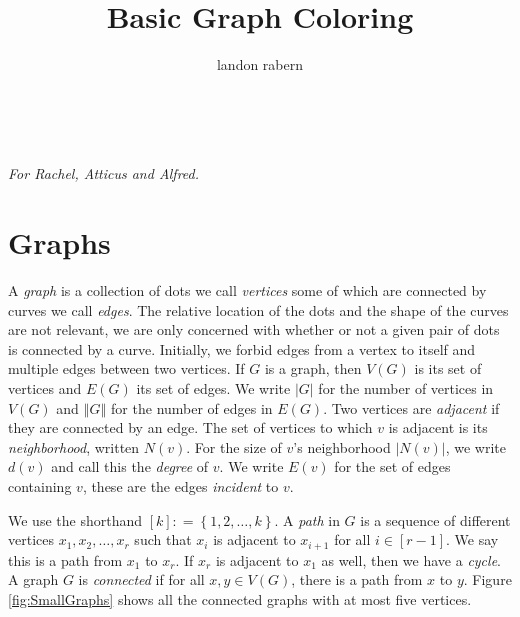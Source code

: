 \documentclass[openany]{tufte-book} %
\title{Basic Graph Coloring}
\author{landon rabern}
\theoremstyle{plain}
\newcommand{\set}[1]{\left\{ #1 \right\}}
\newcommand{\card}[1]{\left|#1\right|}
\newcommand{\size}[1]{\left\Vert#1\right\Vert}
\newcommand{\irange}[1]{\left[#1\right]}
\newcommand{\DefinedAs}{\mathrel{\mathop:}=}
\begin{document}
\frontmatter
\maketitle 


\tableofcontents


\cleardoublepage
~\vfill
\begin{doublespace}
\noindent\fontsize{18}{22}\selectfont\itshape
\nohyphenation
For Rachel, Atticus and Alfred.
\end{doublespace}
\vfill
\vfill

\cleardoublepage
\mainmatter
\chapter{Graphs}
A \emph{graph} is a collection of dots we call \emph{vertices} some of which are connected by curves we call \emph{edges}. 
The relative location of the dots and the shape of the curves are not relevant, we are only concerned with whether or not a given
pair of dots is connected by a curve.  Initially, we forbid edges from a vertex to itself and multiple edges between two vertices.
If $G$ is a graph, then $V(G)$ is its set of vertices and $E(G)$ its set of edges. 
We write $\card{G}$ for the number of vertices in $V(G)$ and $\size{G}$ for the number of edges in $E(G)$.
Two vertices
are \emph{adjacent}  if they are connected by an edge.  The set
of vertices to which $v$ is adjacent is its \emph{neighborhood}, written $N(v)$. 
For the size of $v$'s neighborhood $\card{N(v)}$, we write $d(v)$ and call this the \emph{degree} of $v$.
We write $E(v)$ for the set of edges containing $v$, these are the edges \emph{incident} to $v$.

We use the shorthand $\irange{k} \DefinedAs \set{1,2,\ldots, k}$. A \emph{path} in $G$ is a sequence of different vertices $x_1, x_2, \ldots, x_r$ such that $x_i$ is adjacent to $x_{i+1}$ for all $i \in \irange{r-1}$.  We say
this is a path from $x_1$ to $x_r$.
If $x_r$ is adjacent to $x_1$ as well, then we have a \emph{cycle}.  A graph $G$ is \emph{connected} if for all $x,y \in V(G)$, there is a path from $x$ to $y$.
Figure \ref{fig:SmallGraphs} shows all the connected graphs with at most five vertices.
\end{document}
